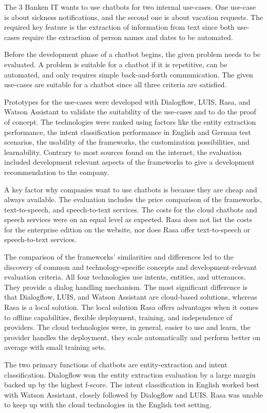 The 3 Banken IT wants to use chatbots for two internal use-cases.
One use-case is about sickness notifications, and the second one is about vacation requests.
The required key feature is the extraction of information from text since both use-cases require the extraction of person names and dates to be automated.

Before the development phase of a chatbot begins, the given problem needs to be evaluated. 
A problem is suitable for a chatbot if it is repetitive, can be automated, and only requires simple back-and-forth communication.
The given use-cases are suitable for a chatbot since all three criteria are satisfied. 

Prototypes for the use-cases were developed with Dialogflow, LUIS, Rasa, and Watson Assistant to validate the suitability of the use-cases and to do the proof of concept.
The technologies were ranked using factors like the entity extraction performance, the intent classification performance in English and German test scenarios, the usability of the frameworks, the customization possibilities, and learnability.
Contrary to most sources found on the internet, the evaluation included development relevant aspects of the frameworks to give a development recommendation to the company. 

A key factor why companies want to use chatbots is because they are cheap and always available.
The evaluation includes the price comparison of the frameworks, text-to-speech, and speech-to-text services.
The costs for the cloud chatbots and speech services were on an equal level as expected.
Rasa does not list the costs for the enterprise edition on the website, nor does Rasa offer text-to-speech or speech-to-text services.

The comparison of the frameworks' similarities and differences led to the discovery of common and technology-specific concepts and development-relevant evaluation criteria.
All four technologies use intents, entities, and utterances.
They provide a dialog handling mechanism.
The most significant difference is that Dialogflow, LUIS, and Watson Assistant are cloud-based solutions, whereas Rasa is a local solution.
The local solution Rasa offers advantages when it comes to offline capabilities, flexible deployment, training, and independence of providers.
The cloud technologies were, in general, easier to use and learn, the provider handles the deployment, they scale automatically and perform better on average with small training sets. 

The two primary functions of chatbots are entity-extraction and intent classification.
Dialogflow won the entity extraction evaluation by a large margin backed up by the highest f-score.
The intent classification in English worked best with Watson Assistant, closely followed by Dialogflow and LUIS.
Rasa was unable to keep up with the cloud technologies in the English test setting.

